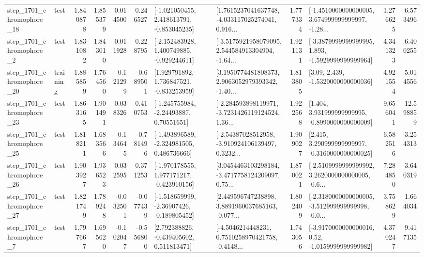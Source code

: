 \begin{tabular}{llrrrrllrlrr}
 step\_1701\_chromophore\_18 &      test &      1.840878 &    1.855379 &      0.014500 &  0.246527 &   [-1.021050455, 2.418613791, -0.853045235] &  [1.7615237041637748, -4.033117025274041, 0.916... &       1.777334 &  [-1.4510000000000005, 3.674999999999997, -1.28... &            1.276625 &          6.573496 \\
  step\_1701\_chromophore\_2 &      test &      1.831082 &    1.843010 &      0.011928 &  0.228795 &   [-2.152483928, 1.400749885, -0.929244611] &  [-3.5175921958079095, 2.544584913304904, -1.64... &       1.921131 &  [-3.3879999999999995, 1.893, -1.5929999999999964] &            4.341323 &          6.400255 \\
 step\_1701\_chromophore\_20 &  training &      1.885859 &    1.764560 &     -0.121299 & -0.689501 &    [1.929791892, 1.736847521, -0.833253959] &  [3.1950774481808373, 2.9063052979393342, -1.40... &       1.813805 &                 [3.09, 2.439, -1.5320000000000036] &            4.921554 &          5.014556 \\
 step\_1701\_chromophore\_23 &      test &      1.863165 &    1.901491 &      0.038326 &  0.410753 &     [-1.245755984, -2.24493887, 0.70551651] &  [-2.284593898119971, -3.7231426119124524, 1.36... &       1.922568 &    [1.404, 3.931999999999995, -0.8990000000000009] &            9.656041 &         12.598859 \\
 step\_1701\_chromophore\_25 &      test &      1.818211 &    1.683566 &     -0.134645 & -0.781496 &   [-1.493896589, -2.324981505, 0.486736666] &  [-2.54387028512958, -3.910924106139497, 0.3232... &       1.909027 &    [2.415, 3.290999999999997, -0.3160000000000025] &            6.582516 &          3.254313 \\
 step\_1701\_chromophore\_26 &      test &      1.903927 &    1.936523 &      0.032595 &  0.371253 &   [-1.970178555, 1.977171217, -0.423910156] &  [3.0454463103298184, -3.4717758124209097, 0.75... &       1.870021 &  [-2.5109999999999992, 3.2620000000000005, -0.6... &            7.284850 &          3.640319 \\
 step\_1701\_chromophore\_27 &      test &      1.821749 &    1.789248 &     -0.032501 & -0.077439 &   [-1.518659999, -2.36907426, -0.189805452] &  [2.449596747238898, 3.8891960037685163, -0.077... &       1.802409 &  [-2.3180000000000005, -3.512999999999998, -0.0... &            3.758629 &          1.664034 \\
  step\_1701\_chromophore\_7 &      test &      1.797667 &    1.695620 &     -0.102047 & -0.556800 &    [2.792388826, -0.439405602, 0.511813471] &  [-4.5046214448231, 0.7510258970421758, -0.4148... &       1.743056 &   [-3.9170000000000016, 0.52, -1.0159999999999982] &            4.370247 &          9.417135 \\

\end{tabular}
